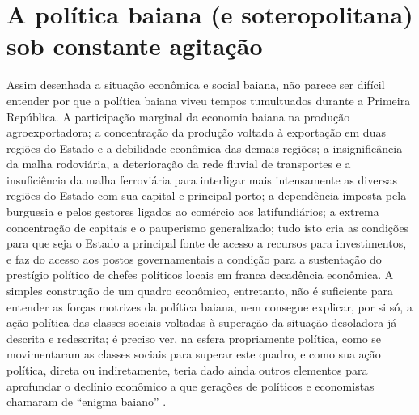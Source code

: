 \section{A política baiana (e soteropolitana) sob constante agitação}\label{sec:1.3}

Assim desenhada a situação econômica e social baiana, não parece ser difícil entender por que a política baiana viveu tempos tumultuados durante a Primeira República. A participação marginal da economia baiana na produção agroexportadora; a concentração da produção voltada à exportação em duas regiões do Estado e a debilidade econômica das demais regiões; a insignificância da malha rodoviária, a deterioração da rede fluvial de transportes e a insuficiência da malha ferroviária para interligar mais intensamente as diversas regiões do Estado com sua capital e principal porto; a dependência imposta pela burguesia e pelos gestores ligados ao comércio aos latifundiários; a extrema concentração de capitais e o pauperismo generalizado; tudo isto cria as condições para que seja o Estado a principal fonte de acesso a recursos para investimentos, e faz do acesso aos postos governamentais a condição para a sustentação do prestígio político de chefes políticos locais em franca decadência econômica. A simples construção de um quadro econômico, entretanto, não é suficiente para entender as forças motrizes da política baiana, nem consegue explicar, por si só, a ação política das classes sociais voltadas à superação da situação desoladora já descrita e redescrita; é preciso ver, na esfera propriamente política, como se movimentaram as classes sociais para superar este quadro, e como sua ação política, direta ou indiretamente, teria dado ainda outros elementos para aprofundar o declínio econômico a que gerações de políticos e economistas chamaram de ``enigma baiano'' \cite{aguiar_notas_1958}.

